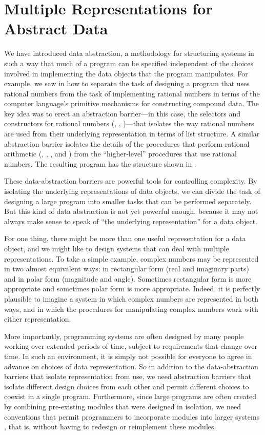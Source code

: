 \section{Multiple Representations for Abstract Data}
\label{Section 2.4}

We have introduced data abstraction, a methodology for structuring systems in such a way that much of a program can be specified independent of the choices involved in implementing the data objects that the program manipulates.
For example, we saw in  how to separate the task of designing a program that uses rational numbers from the task of implementing rational numbers in terms of the computer language’s primitive mechanisms for constructing compound data.
The key idea was to erect an abstraction barrier---in this case, the selectors and constructors for rational numbers (, , )---that isolates the way rational numbers are used from their underlying representation in terms of list structure.
A similar abstraction barrier isolates the details of the procedures that perform rational arithmetic (, , , and ) from the “higher-level” procedures that use rational numbers.
The resulting program has the structure shown in .

These data-abstraction barriers are powerful tools for controlling complexity.
By isolating the underlying representations of data objects, we can divide the task of designing a large program into smaller tasks that can be performed separately.
But this kind of data abstraction is not yet powerful enough, because it may not always make sense to speak of “the underlying representation” for a data object.

For one thing, there might be more than one useful representation for a data object, and we might like to design systems that can deal with multiple representations.
To take a simple example, complex numbers may be represented in two almost equivalent ways:
in rectangular form (real and imaginary parts) and in polar form (magnitude and angle).
Sometimes rectangular form is more appropriate and sometimes polar form is more appropriate.
Indeed, it is perfectly plausible to imagine a system in which complex numbers are represented in both ways, and in which the procedures for manipulating complex numbers work with either representation.

More importantly, programming systems are often designed by many people working over extended periods of time, subject to requirements that change over time.
In such an environment, it is simply not possible for everyone to agree in advance on choices of data representation.
So in addition to the data-abstraction barriers that isolate representation from use, we need abstraction barriers that isolate different design choices from each other and permit different choices to coexist in a single program.
Furthermore, since large programs are often created by combining pre-existing modules that were designed in isolation, we need conventions that permit programmers to incorporate modules into larger systems , that is, without having to redesign or reimplement these modules.

